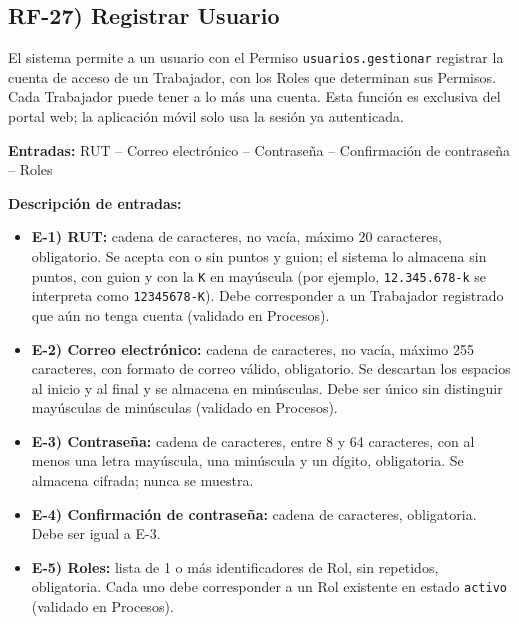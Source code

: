 
\subsection*{RF-27) Registrar Usuario}
El sistema permite a un usuario con el Permiso \texttt{usuarios.gestionar} registrar la cuenta de acceso de un Trabajador, con los Roles que determinan sus Permisos. Cada Trabajador puede tener a lo m\'as una cuenta. Esta funci\'on es exclusiva del portal web; la aplicaci\'on m\'ovil solo usa la sesi\'on ya autenticada.

\textbf{Entradas:} RUT -- Correo electr\'onico -- Contrase\~na -- Confirmaci\'on de contrase\~na -- Roles

\textbf{Descripci\'on de entradas:}
\begin{itemize}[label={}, leftmargin=1.5em]
  \item \textbf{E-1) RUT:} cadena de caracteres, no vac\'ia, m\'aximo 20 caracteres, obligatorio. Se acepta con o sin puntos y guion; el sistema lo almacena sin puntos, con guion y con la \texttt{K} en may\'uscula (por ejemplo, \texttt{12.345.678-k} se interpreta como \texttt{12345678-K}). Debe corresponder a un Trabajador registrado que a\'un no tenga cuenta (validado en Procesos).
  \item \textbf{E-2) Correo electr\'onico:} cadena de caracteres, no vac\'ia, m\'aximo 255 caracteres, con formato de correo v\'alido, obligatorio. Se descartan los espacios al inicio y al final y se almacena en min\'usculas. Debe ser \'unico sin distinguir may\'usculas de min\'usculas (validado en Procesos).
  \item \textbf{E-3) Contrase\~na:} cadena de caracteres, entre 8 y 64 caracteres, con al menos una letra may\'uscula, una min\'uscula y un d\'igito, obligatoria. Se almacena cifrada; nunca se muestra.
  \item \textbf{E-4) Confirmaci\'on de contrase\~na:} cadena de caracteres, obligatoria. Debe ser igual a E-3.
  \item \textbf{E-5) Roles:} lista de 1 o m\'as identificadores de Rol, sin repetidos, obligatoria. Cada uno debe corresponder a un Rol existente en estado \texttt{activo} (validado en Procesos).
\end{itemize}


